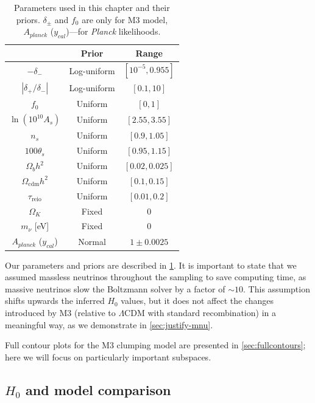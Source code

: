 \begin{table}[ht!]
\centering
\begin{tabular}{|c|cc|}
\hline
 & Prior & Range \\
\hline
$-\delta_-$ & Log-uniform & $[10^{-5},0.955]$ \\
$\left| \delta_+/\delta_- \right|$ & Log-uniform & $[0.1,10]$ \\
$f_0$ & Uniform & $[0,1]$ \\
\hline
$\ln(10^{10} A_s)$ & Uniform & $[2.55,3.55]$ \\
$n_s$ & Uniform & $[0.9,1.05]$ \\
$100\theta_s$ & Uniform & $[0.95,1.15]$ \\
$\Omega_b h^2$ & Uniform & $[0.02,0.025]$ \\
$\Omega_\mathrm{cdm} h^2$ & Uniform & $[0.1,0.15]$ \\
$\tau_\mathrm{reio}$ & Uniform & $[0.01,0.2]$ \\
\hline
$\Omega_K$ & Fixed & 0 \\
$m_\nu$ [eV] & Fixed & 0 \\
\hline
$A_{planck}$ ($y_{cal}$) & Normal & $1\pm 0.0025$ \\
\hline
\end{tabular}
\caption[Parameters used in this chapter and their priors]{Parameters used in this chapter and their priors.
$\delta_\pm$ and $f_0$ are only for M3 model, $A_{planck}$ ($y_{cal}$)---for {\it Planck} likelihoods.}
\label{tab:params}
\end{table}

Our parameters and priors are described in \cref{tab:params}.
It is important to state that we assumed massless neutrinos throughout the sampling to save computing time, as massive neutrinos slow the Boltzmann solver by a factor of $\sim 10$. 
This assumption shifts upwards the inferred $H_0$ values, but it does not affect the changes introduced by M3 (relative to $\Lambda$CDM with standard recombination) in a meaningful way, as we demonstrate in \cref{sec:justify-mnu}.

Full contour plots for the M3 clumping model are presented in \cref{sec:fullcontours}; here we will focus on particularly important subspaces.

\subsection{\texorpdfstring{$H_0$}{H0} and model comparison}

